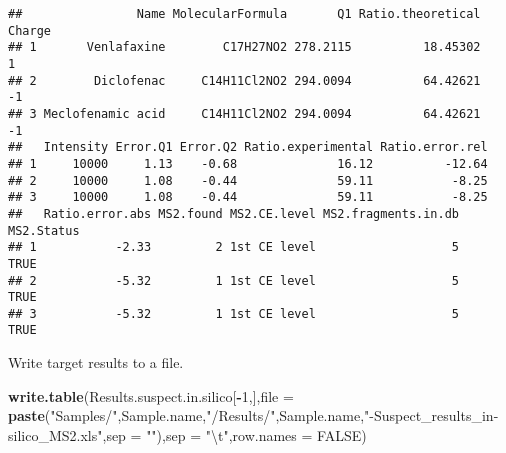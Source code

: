 \documentclass[]{article}
\newenvironment{Shaded}{\begin{snugshade}}{\end{snugshade}}
\newcommand{\KeywordTok}[1]{\textcolor[rgb]{0.13,0.29,0.53}{\textbf{#1}}}
\newcommand{\DataTypeTok}[1]{\textcolor[rgb]{0.13,0.29,0.53}{#1}}
\newcommand{\DecValTok}[1]{\textcolor[rgb]{0.00,0.00,0.81}{#1}}
\newcommand{\CharTok}[1]{\textcolor[rgb]{0.31,0.60,0.02}{#1}}
\newcommand{\StringTok}[1]{\textcolor[rgb]{0.31,0.60,0.02}{#1}}
\newcommand{\OtherTok}[1]{\textcolor[rgb]{0.56,0.35,0.01}{#1}}
\newcommand{\OperatorTok}[1]{\textcolor[rgb]{0.81,0.36,0.00}{\textbf{#1}}}
\newcommand{\NormalTok}[1]{#1}
\begin{document}
\begin{verbatim}
##                Name MolecularFormula       Q1 Ratio.theoretical Charge
## 1       Venlafaxine        C17H27NO2 278.2115          18.45302      1
## 2        Diclofenac     C14H11Cl2NO2 294.0094          64.42621     -1
## 3 Meclofenamic acid     C14H11Cl2NO2 294.0094          64.42621     -1
##   Intensity Error.Q1 Error.Q2 Ratio.experimental Ratio.error.rel
## 1     10000     1.13    -0.68              16.12          -12.64
## 2     10000     1.08    -0.44              59.11           -8.25
## 3     10000     1.08    -0.44              59.11           -8.25
##   Ratio.error.abs MS2.found MS2.CE.level MS2.fragments.in.db MS2.Status
## 1           -2.33         2 1st CE level                   5       TRUE
## 2           -5.32         1 1st CE level                   5       TRUE
## 3           -5.32         1 1st CE level                   5       TRUE
\end{verbatim}

Write target results to a file.

\begin{Shaded}
\begin{Highlighting}[]
\KeywordTok{write.table}\NormalTok{(Results.suspect.in.silico[}\OperatorTok{-}\DecValTok{1}\NormalTok{,],}\DataTypeTok{file =} \KeywordTok{paste}\NormalTok{(}\StringTok{"Samples/"}\NormalTok{,Sample.name,}\StringTok{"/Results/"}\NormalTok{,Sample.name,}\StringTok{"-Suspect_results_in-silico_MS2.xls"}\NormalTok{,}\DataTypeTok{sep =} \StringTok{""}\NormalTok{),}\DataTypeTok{sep =} \StringTok{"}\CharTok{\textbackslash{}t}\StringTok{"}\NormalTok{,}\DataTypeTok{row.names =} \OtherTok{FALSE}\NormalTok{)}
\end{Highlighting}
\end{Shaded}
\end{document}
